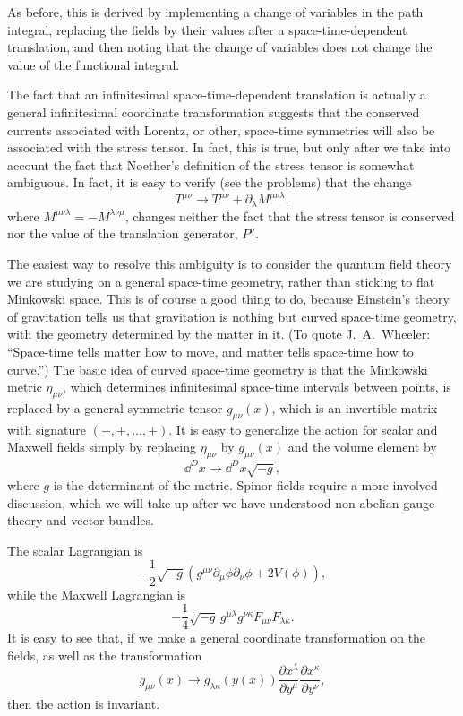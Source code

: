 As before, this is derived by implementing a change of variables in the
path integral, replacing the fields by their values after a space-time-dependent
translation, and then noting that the change of variables does not change the
value of the functional integral.

The fact that an infinitesimal space-time-dependent translation is actually a
general infinitesimal coordinate transformation suggests that the conserved
currents associated with Lorentz, or other, space-time symmetries will also be
associated with the stress tensor. In fact, this is true, but only after we take
into account the fact that Noether's definition of the stress tensor is somewhat
ambiguous. In fact, it is easy to verify (see the problems) that the change
\begin{equation*}
  T^{\mu\nu}\longrightarrow T^{\mu\nu}+\partial_\lambda M^{\mu\nu\lambda},
\end{equation*}
where $M^{\mu\nu\lambda}=-M^{\lambda\nu\mu}$, changes neither the fact that
the stress tensor is conserved nor the value of the translation generator,
$P^\nu$.

The easiest way to resolve this ambiguity is to consider the quantum field
theory we are studying on a general space-time geometry, rather than sticking
to flat Minkowski space. This is of course a good thing to do, because
Einstein's theory of gravitation tells us that gravitation is nothing but curved
space-time geometry, with the geometry determined by the matter in it. (To
quote J.~A.~Wheeler: ``Space-time tells matter how to move, and matter tells
space-time how to curve.'') The basic idea of curved space-time geometry is
that the Minkowski metric $\eta_{\mu\nu}$, which determines infinitesimal
space-time intervals between points, is replaced by a general symmetric tensor
$g_{\mu\nu}(x)$, which is an invertible matrix with signature
$(-,+,\ldots,+)$. It is easy to generalize the action for scalar and Maxwell fields
simply by replacing $\eta_{\mu\nu}$ by $g_{\mu\nu}(x)$ and the volume element
by
\begin{equation*}
  \dd^D x\longrightarrow\dd^D x\sqrt{-g},
\end{equation*}
where $g$ is the determinant of the metric. Spinor fields require a more
involved discussion, which we will take up after we have understood non-abelian
gauge theory and vector bundles.

The scalar Lagrangian is
\begin{equation*}
  -\frac12\sqrt{-g}\left(g^{\mu\nu}\partial_\mu\phi\partial_\nu\phi+2V(\phi)\right),
\end{equation*}
while the Maxwell Lagrangian is
\begin{equation*}
  -\frac14\sqrt{-g}\,g^{\mu\lambda}g^{\nu\kappa}F_{\mu\nu}F_{\lambda\kappa}.
\end{equation*}
It is easy to see that, if we make a general coordinate transformation on the
fields, as well as the transformation
\begin{equation*}
  g_{\mu\nu}(x)\longrightarrow g_{\lambda\kappa}(y(x))
  \frac{\partial x^\lambda}{\partial y^\mu}
  \frac{\partial x^\kappa}{\partial y^\nu},
\end{equation*}
then the action is invariant.

